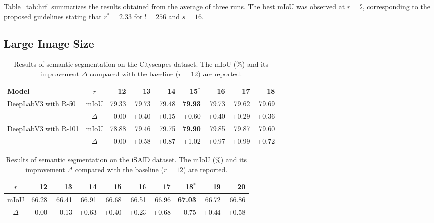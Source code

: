 \documentclass{article}
\def\tabref#1{Table~\ref{#1}}
\begin{document}
\tabref{tab:hrf} summarizes the results obtained from the average of three runs. The best mIoU was observed at $r=2$, corresponding to the proposed guidelines stating that $r^*=2.33$ for $l=256$ and $s=16$.



\subsection{Large Image Size}
\label{sec:largesize}

\begin{table}[t!]
	\caption{Results of semantic segmentation on the Cityscapes dataset. The mIoU (\%) and its improvement $\Delta$ compared with the baseline ($r=12$) are reported.}
	\label{tab:city}
	\centering
	\begin{tabular}{l|c|rrrrrrr}
		\toprule
		Model                                 & $r$      & 12    & 13    & 14    & 15$^*$         & 16    & 17    & 18    \\
		\midrule
		\multirow{2}{*}{DeepLabV3 with R-50}  & mIoU     & 79.33 & 79.73 & 79.48 & \textbf{79.93} & 79.73 & 79.62 & 79.69 \\
		                                      & $\Delta$ & 0.00  & +0.40 & +0.15 & +0.60          & +0.40 & +0.29 & +0.36 \\
		\midrule
		\multirow{2}{*}{DeepLabV3 with R-101} & mIoU     & 78.88 & 79.46 & 79.75 & \textbf{79.90} & 79.85 & 79.87 & 79.60 \\
		                                      & $\Delta$ & 0.00  & +0.58 & +0.87 & +1.02          & +0.97 & +0.99 & +0.72 \\
		\bottomrule
	\end{tabular}
\end{table}

\begin{table}
	\caption{Results of semantic segmentation on the iSAID dataset. The mIoU (\%) and its improvement $\Delta$ compared with the baseline ($r=12$) are reported.}
	\label{tab:isaid}
	\centering
	\begin{tabular}{c|rrrrrrrrr}
		\toprule
		$r$      & 12    & 13    & 14    & 15    & 16    & 17    & 18$^*$         & 19    & 20    \\
		\midrule
		mIoU     & 66.28 & 66.41 & 66.91 & 66.68 & 66.51 & 66.96 & \textbf{67.03} & 66.72 & 66.86 \\
		$\Delta$ & 0.00  & +0.13 & +0.63 & +0.40 & +0.23 & +0.68 & +0.75          & +0.44 & +0.58 \\
		\bottomrule
	\end{tabular}
\end{table}
\end{document}
